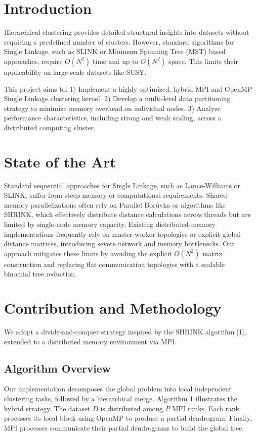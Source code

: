 \section{Introduction}
Hierarchical clustering provides detailed structural insights into datasets without requiring a predefined number of clusters. However, standard algorithms for Single Linkage, such as SLINK or Minimum Spanning Tree (MST) based approaches, require $O(N^2)$ time and up to $O(N^2)$ space. This limits their applicability on large-scale datasets like SUSY.

This project aims to:
1) Implement a highly optimized, hybrid MPI and OpenMP Single Linkage clustering kernel.
2) Develop a multi-level data partitioning strategy to minimize memory overhead on individual nodes.
3) Analyze performance characteristics, including strong and weak scaling, across a distributed computing cluster.

\section{State of the Art}
Standard sequential approaches for Single Linkage, such as Lance-Williams or SLINK, suffer from steep memory or computational requirements. Shared-memory parallelizations often rely on Parallel Bor\r{u}vka or algorithms like SHRINK, which effectively distribute distance calculations across threads but are limited by single-node memory capacity. Existing distributed-memory implementations frequently rely on master-worker topologies or explicit global distance matrices, introducing severe network and memory bottlenecks. Our approach mitigates these limits by avoiding the explicit $O(N^2)$ matrix construction and replacing flat communication topologies with a scalable binomial tree reduction.

\section{Contribution and Methodology}
We adopt a divide-and-conquer strategy inspired by the SHRINK algorithm [1], extended to a distributed memory environment via MPI. 

\subsection{Algorithm Overview}
Our implementation decomposes the global problem into local independent clustering tasks, followed by a hierarchical merge. Algorithm 1 illustrates the hybrid strategy. The dataset $D$ is distributed among $P$ MPI ranks. Each rank processes its local block using OpenMP to produce a partial dendrogram. Finally, MPI processes communicate their partial dendrograms to build the global tree.

